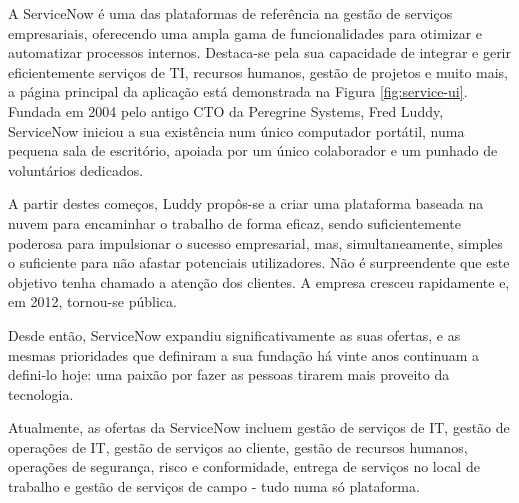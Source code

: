         A ServiceNow é uma das plataformas de referência na gestão de serviços empresariais, oferecendo uma ampla gama de funcionalidades para otimizar e automatizar processos internos. Destaca-se pela sua capacidade de integrar e gerir eficientemente serviços de TI, recursos humanos, gestão de projetos e muito mais, a página principal da aplicação está demonstrada na Figura \ref{fig:service-ui}. Fundada em 2004 pelo antigo CTO da Peregrine Systems, Fred Luddy, ServiceNow iniciou a sua existência num único computador portátil, numa pequena sala de escritório, apoiada por um único colaborador e um punhado de voluntários dedicados.

        A partir destes começos, Luddy propôs-se a criar uma plataforma baseada na nuvem para encaminhar o trabalho de forma eficaz, sendo suficientemente poderosa para impulsionar o sucesso empresarial, mas, simultaneamente, simples o suficiente para não afastar potenciais utilizadores. Não é surpreendente que este objetivo tenha chamado a atenção dos clientes. A empresa cresceu rapidamente e, em 2012, tornou-se pública.
        
        Desde então, ServiceNow expandiu significativamente as suas ofertas, e as mesmas prioridades que definiram a sua fundação há vinte anos continuam a defini-lo hoje: uma paixão por fazer as pessoas tirarem mais proveito da tecnologia. 
        
        Atualmente, as ofertas da ServiceNow incluem gestão de serviços de IT, gestão de operações de IT, gestão de serviços ao cliente, gestão de recursos humanos, operações de segurança, risco e conformidade, entrega de serviços no local de trabalho e gestão de serviços de campo - tudo numa só plataforma.

